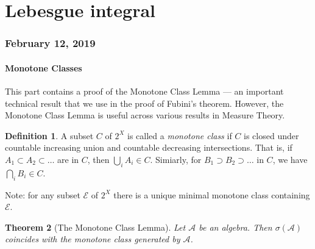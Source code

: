 \documentclass{article}
\newtheorem{theorem}{Theorem}[section]
\theoremstyle{definition}
\newtheorem{definition}[theorem]{Definition}
\begin{document}
\part{Lebesgue integral}

\section{February 12, 2019}

\subsection{Monotone Classes}

This part contains a proof of the Monotone Class Lemma --- an 
important technical result that we
use in the proof of Fubini's theorem. 
However, the Monotone Class Lemma is useful across various
results in Measure Theory.

\begin{definition}
	A subset $C$ of $2^X$ is called a \emph{monotone class}
	if $C$ is closed under countable increasing union and countable decreasing intersections.
	That is,
	if $A_1\subset A_2 \subset \ldots $ are in $C$, then 
	$\bigcup_{i} A_i \in C$. Simiarly,
	for $B_1\supset B_2\supset \ldots $ in $C$, we have $\bigcap_{i}B_i\in C$.
\end{definition}

Note: for any subset $\mathscr{E}$ of $2^X$ there is a unique minimal monotone class 
containing $\mathscr{E}$.

\begin{theorem}[The Monotone Class Lemma]
	Let $\mathscr{A}$ be an algebra. Then
	$\sigma(\mathscr{A})$
	coincides with the monotone class generated by  $\mathscr{A}$.
\end{theorem}
\end{document}
